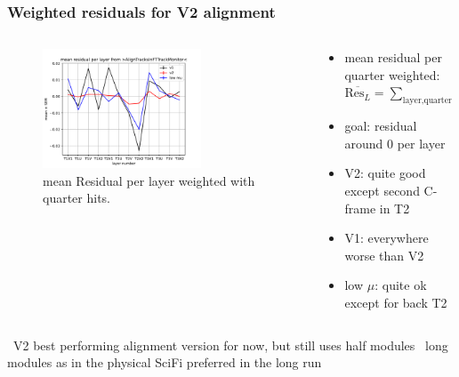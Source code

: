 \documentclass[aspectratio=1610, 12pt]{beamer}
\begin{document}
\begin{frame}\frametitle{Weighted residuals for V2 alignment}
    \begin{columns}
      \begin{column}[c]{0.48\textwidth}
        \begin{figure}
          \centering
          \includegraphics[width=0.7\textwidth]{2023-mar-9-DPG/meanResidual_AlignTracks_weighted.pdf}
          \caption{mean Residual per layer weighted with quarter hits.}
        \end{figure}
      \end{column}
      \begin{column}{0.48\textwidth}
        \begin{itemize}
          \item mean residual per quarter weighted: $
              \overline{\text{Res}_{L}} = \sum_{\text{layer}, \text{quarter}} \frac{\text{hits quarter of layer}}{\text{hits layer}}$
          \item goal: residual around 0 per layer
          \item V2: quite good except second C-frame in T2
          \item V1: everywhere worse than V2
          \item low $\mu$: quite ok except for back T2
        \end{itemize}
      \end{column}
    \end{columns}
  \to\, V2 best performing alignment version for now, but still uses half modules
  \to\, long modules as in the physical SciFi preferred in the long run
\end{frame}
\end{document}
